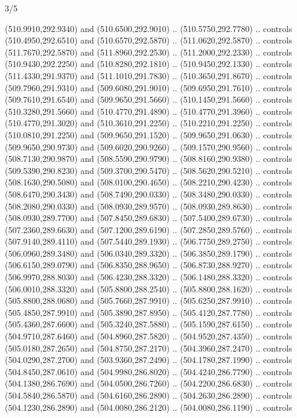 \begin{flagdescription}{3/5}
\begin{scope}[shift={(0.5\flaglength,0.5\flagwidth)},scale=\flagwidth/1075]
\begin{scope}[y=0.80pt, x=0.80pt, yscale=-2.37, xscale=2.37,xshift=-402,yshift=-230.4]
  (510.9910,292.9340) and (510.6500,292.9010) .. (510.5750,292.7780) .. controls
  (510.4950,292.6510) and (510.6570,292.5870) .. (511.0620,292.5870) .. controls
  (511.7670,292.5870) and (511.8960,292.2530) .. (511.2000,292.2330) .. controls
  (510.9430,292.2250) and (510.8280,292.1810) .. (510.9450,292.1330) .. controls
  (511.4330,291.9370) and (511.1010,291.7830) .. (510.3650,291.8670) .. controls
  (509.7960,291.9310) and (509.6080,291.9010) .. (509.6950,291.7610) .. controls
  (509.7610,291.6540) and (509.9650,291.5660) .. (510.1450,291.5660) .. controls
  (510.3280,291.5660) and (510.4770,291.4890) .. (510.4770,291.3960) .. controls
  (510.4770,291.3020) and (510.3610,291.2250) .. (510.2210,291.2250) .. controls
  (510.0810,291.2250) and (509.9650,291.1520) .. (509.9650,291.0630) .. controls
  (509.9650,290.9730) and (509.6020,290.9260) .. (509.1570,290.9560) .. controls
  (508.7130,290.9870) and (508.5590,290.9790) .. (508.8160,290.9380) .. controls
  (509.5390,290.8230) and (509.3700,290.5470) .. (508.5620,290.5210) .. controls
  (508.1630,290.5080) and (508.0100,290.4650) .. (508.2210,290.4230) .. controls
  (508.6470,290.3430) and (508.7490,290.0330) .. (508.3480,290.0330) .. controls
  (508.2080,290.0330) and (508.0930,289.9570) .. (508.0930,289.8630) .. controls
  (508.0930,289.7700) and (507.8450,289.6830) .. (507.5400,289.6730) .. controls
  (507.2360,289.6630) and (507.1200,289.6190) .. (507.2850,289.5760) .. controls
  (507.9140,289.4110) and (507.5440,289.1930) .. (506.7750,289.2750) .. controls
  (506.0960,289.3480) and (506.0340,289.3320) .. (506.3850,289.1790) .. controls
  (506.6150,289.0790) and (506.8350,288.9650) .. (506.8730,288.9270) .. controls
  (506.9970,288.8030) and (506.4230,288.3320) .. (506.1480,288.3320) .. controls
  (506.0010,288.3320) and (505.8800,288.2540) .. (505.8800,288.1620) .. controls
  (505.8800,288.0680) and (505.7660,287.9910) .. (505.6250,287.9910) .. controls
  (505.4850,287.9910) and (505.3890,287.8950) .. (505.4120,287.7780) .. controls
  (505.4360,287.6600) and (505.3240,287.5880) .. (505.1590,287.6150) .. controls
  (504.9710,287.6460) and (504.8960,287.5820) .. (504.9520,287.4350) .. controls
  (505.0180,287.2650) and (504.8750,287.2170) .. (504.3960,287.2470) .. controls
  (504.0290,287.2700) and (503.9360,287.2490) .. (504.1780,287.1990) .. controls
  (504.8450,287.0610) and (504.9980,286.8020) .. (504.4240,286.7790) .. controls
  (504.1380,286.7690) and (504.0500,286.7260) .. (504.2200,286.6830) .. controls
  (504.5840,286.5870) and (504.6160,286.2890) .. (504.2630,286.2890) .. controls
  (504.1230,286.2890) and (504.0080,286.2120) .. (504.0080,286.1190) .. controls

\end{scope}
\end{scope}
\end{flagdescription}
